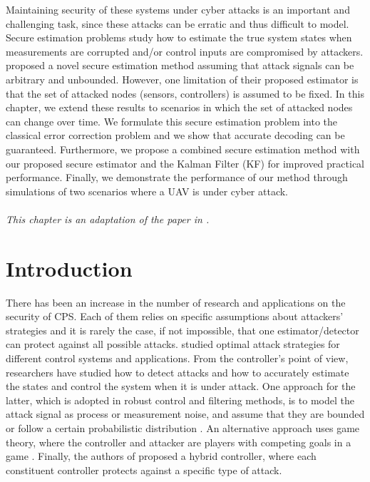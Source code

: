\documentclass[../../thesis.tex]{subfiles}
\begin{document}
Maintaining security of these systems under cyber attacks is an important and challenging task, since these attacks can be erratic and thus difficult to model. Secure estimation problems study how to estimate the true system states when  measurements are corrupted and/or control inputs are compromised by attackers. \cite{Fawzi:2014} proposed a novel secure estimation method assuming that attack signals can be arbitrary and unbounded. However, one limitation of their proposed estimator is that the set of attacked nodes (sensors, controllers) is assumed to be fixed. 
In this chapter, we extend these results to scenarios in which the set of attacked nodes can change over time. We formulate this secure estimation problem into the classical error correction problem \cite{tao11} and we show that accurate decoding can be guaranteed. Furthermore, we propose a combined secure estimation method with our proposed secure estimator and the Kalman Filter (KF) for improved practical performance. Finally,  we demonstrate the performance of our method through simulations of two scenarios where a UAV is under cyber attack.
\\
\\
\noindent
\textit{This chapter is an adaptation of the paper in \cite{Hu:2016uav}.}

\section{Introduction}

There has been an increase in the number of research and applications on the security of CPS. Each of them relies on specific assumptions about attackers' strategies and it is rarely the case, if not impossible, that one estimator/detector can protect against all possible attacks. 
\cite{Tong}\cite{KwonACC}\cite{liu2011false}\cite{teixeira2010cyber} studied optimal attack strategies for different control systems and applications. From the controller's point of view, researchers have studied how to detect attacks \cite{Blanke}\cite{Willsky} and how to accurately estimate the states and control the system when it is under attack. One approach for the latter, which is adopted in robust control and filtering methods, is to model the attack signal as process or measurement noise, and assume that they are bounded \cite{Zhou_Doyle} or follow a certain probabilistic distribution \cite{Bullo}\cite{Liu}.
An alternative approach uses game theory, where the controller and attacker are players with competing goals in a game \cite{Wu}\cite{Basar}\cite{Basar2}\cite{Walrand}\cite{Pappas}. Finally, the authors of \cite{KwonCDC} proposed a hybrid controller, where each constituent controller protects against a specific type of attack.
\end{document}
